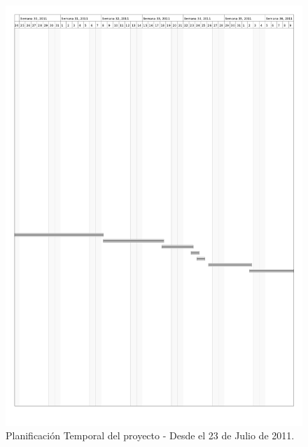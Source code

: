 \pagebreak
\begin{figure}[H]
\begin{center}
\includegraphics[width=15.5cm]{planificacion_graphvisualx_3.png}
\caption{Planificación Temporal del proyecto - Desde el 23 de Julio de 2011.}
\end{center}
\end{figure}

